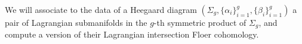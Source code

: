 

We will associate to the data of a Heegaard diagram $(\Sigma_g, \{\alpha_i\}_{i=1}^g, \{\beta_i\}_{i=1}^g)$ a pair of Lagrangian submanifolds in the $g$-th symmetric product of $\Sigma_g$, and compute a version of their Lagrangian intersection Floer cohomology. 




